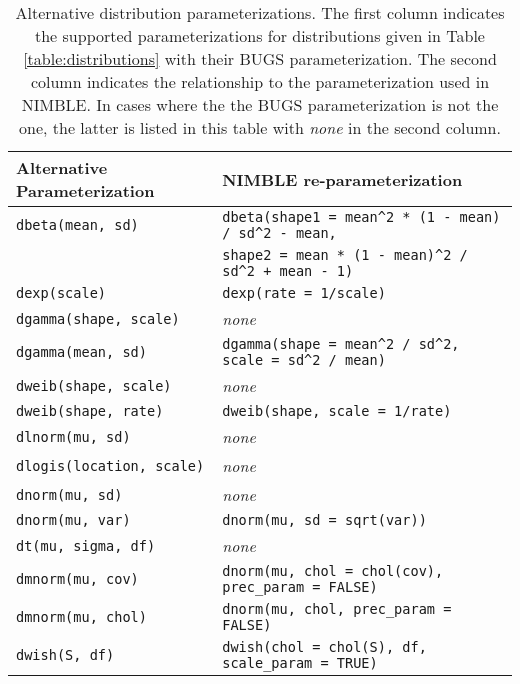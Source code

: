 \begin{table}[!h]
  \begin{center}
    \begin{tabular}{ll}
      \hline
      Alternative Parameterization & NIMBLE re-parameterization \\
      \hline
      \texttt{dbeta(mean, sd)} & \verb|dbeta(shape1 = mean^2 * (1 - mean) / sd^2 - mean,| \\
      & \verb|shape2 = mean * (1 - mean)^2 / sd^2 + mean - 1)| \\
      \texttt{dexp(scale)} & \texttt{dexp(rate = 1/scale)} \\
     \texttt{dgamma(shape, scale)} & \textit{none} \\
      \texttt{dgamma(mean, sd)} & \verb|dgamma(shape = mean^2 / sd^2, scale = sd^2 / mean)| \\
     \texttt{dweib(shape, scale)} & \textit{none} \\
     \texttt{dweib(shape, rate)} & \texttt{dweib(shape, scale = 1/rate)} \\
     \texttt{dlnorm(mu, sd)} & \textit{none} \\
     \texttt{dlogis(location, scale)} & \textit{none} \\
     \texttt{dnorm(mu, sd)} & \textit{none} \\
     \texttt{dnorm(mu, var)} & \texttt{dnorm(mu, sd = sqrt(var))} \\
     \texttt{dt(mu, sigma, df)} & \textit{none} \\
     \texttt{dmnorm(mu, cov)} & \texttt{dnorm(mu, chol = chol(cov), prec\_param = FALSE)} \\
     \texttt{dmnorm(mu, chol)} & \texttt{dnorm(mu, chol, prec\_param = FALSE)} \\
     \texttt{dwish(S, df)} & \texttt{dwish(chol = chol(S), df, scale\_param = TRUE)}\\ 
     \end{tabular}
  \caption{Alternative distribution parameterizations. The first
    column indicates the supported parameterizations for
    distributions given in Table \ref{table:distributions} with their
    BUGS parameterization. The second column indicates the
    relationship to the  parameterization used in
    NIMBLE. In cases where the the BUGS parameterization is not
    the  one, the latter is listed in this table with
    \textit{none} in the second column.}
    \label{table:distributions-alternates}
  \end{center}
\end{table}
